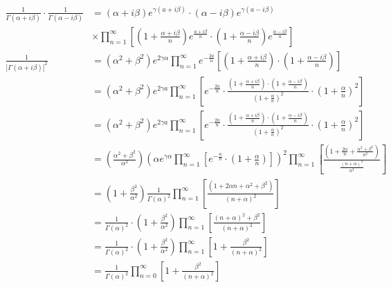 $$
\begin{aligned}
\frac{1}{\Gamma(\alpha+i \beta)} \cdot \frac{1}{\Gamma(\alpha-i \beta)}&=(\alpha+i \beta) e^{\gamma(a+i \beta)} \cdot(\alpha-i \beta) e^{\gamma(a-i \beta)} \\
&\times \prod_{n=1}^{\infty}\left[\left(1+\frac{\alpha+i \beta}{n}\right) e^{\frac{a+i \beta}{n}} \cdot\left(1+\frac{\alpha-i \beta}{n}\right) e^{\frac{\alpha-i \beta}{n}}\right] \\
\frac{1}{|\Gamma(\alpha+i \beta)|^{2}}&=\left(\alpha^{2}+\beta^{2}\right) e^{2\gamma \alpha} \prod_{n=1}^{\infty} e^{-\frac{2 a}{n}}\left[\left(1+\frac{\alpha+i \beta}{n}\right) \cdot\left(1+\frac{\alpha-i \beta}{n}\right)\right] \\
&=\left(\alpha^{2}+\beta^{2}\right) e^{2 \gamma a} \prod_{n=1}^{\infty}\left[e^{-\frac{2 a}{n}} \cdot \frac{\left(1+\frac{\alpha+i \beta}{n}\right) \cdot\left(1+\frac{\alpha-i \beta}{n}\right)}{\left(1+\frac{\alpha}{n}\right)^{2}} \cdot\left(1+\frac{\alpha}{n}\right)^{2}\right] \\
&=\left(\alpha^{2}+\beta^{2}\right) e^{2 \gamma a} \prod_{n=1}^{\infty}\left[e^{-\frac{2 a}{n}} \cdot \frac{\left(1+\frac{\alpha+i \beta}{n}\right) \cdot\left(1+\frac{\alpha-i \beta}{n}\right)}{\left(1+\frac{\alpha}{n}\right)^{2}} \cdot\left(1+\frac{\alpha}{n}\right)^{2}\right] \\
&=\left(\frac{\alpha^{2}+\beta^{2}}{\alpha^{2}}\right)\left(\alpha e^{\gamma \alpha} \prod_{n=1}^{\infty}\left[e^{-\frac{a}{n}} \cdot\left(1+\frac{\alpha}{n}\right)\right]\right)^{2} \prod_{n=1}^{\infty}\left[\frac{\left(1+\frac{2 \alpha}{n}+\frac{\alpha^{2}+\beta^{2}}{n^{2}}\right)}{\frac{(n+\alpha)^{2}}{n^{2}}}\right] \\
&=\left(1+\frac{\beta^{2}}{\alpha^{2}}\right) \frac{1}{\Gamma(\alpha)^{2}} \prod_{n=1}^{\infty}\left[\frac{\left(1+2 \alpha n+\alpha^{2}+\beta^{2}\right)}{(n+\alpha)^{2}}\right] \\
&=\frac{1}{\Gamma(\alpha)^{2}} \cdot\left(1+\frac{\beta^{2}}{\alpha^{2}}\right) \prod_{n=1}^{\infty}\left[\frac{(n+\alpha)^{2}+\beta^{2}}{(n+\alpha)^{2}}\right] \\
&=\frac{1}{\Gamma(\alpha)^{2}} \cdot\left(1+\frac{\beta^{2}}{\alpha^{2}}\right) \prod_{n=1}^{\infty}\left[1+\frac{\beta^{2}}{(n+\alpha)^{2}}\right] \\
&=\frac{1}{\Gamma(\alpha)^{2}} \prod_{n=0}^{\infty}\left[1+\frac{\beta^{2}}{(n+\alpha)^{2}}\right] \\
\end{aligned}
$$

